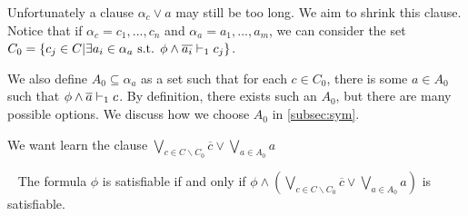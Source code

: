 Unfortunately a clause $\alpha_c \lor a$ may still be too long. We aim to
shrink this clause. Notice that if $\alpha_c = c_1, ..., c_n$ and $\alpha_a =
a_1, ..., a_m$, we can consider the set $C_0 = \{c_j \in C| \exists a_i \in
\alpha_a \text{ s.t. } \phi \land \overline{a_i} \vdash_1 c_j \}$.







We also define $A_0 \subseteq \alpha_a$ as a set such that for each $c \in C_0$,
there is some $a \in A_0$ such that $\phi \land \overline{a} \vdash_1 c$. By definition,
there exists such an $A_0$, but there are many possible options. We discuss how
we choose $A_0$ in \autoref{subsec:sym}.



We want learn the clause $\bigvee_{c \in C \backslash C_0} \overline{c} \lor
\bigvee_{a \in A_0} a$


\begin{theorem}~\label{thm:shrunkgbcequisat}
    The formula $\phi$ is satisfiable if and only if $\phi \land (\bigvee_{c \in C \backslash C_0} \overline{c} \lor \bigvee_{a \in A_0} a)$ is satisfiable.
\end{theorem}

